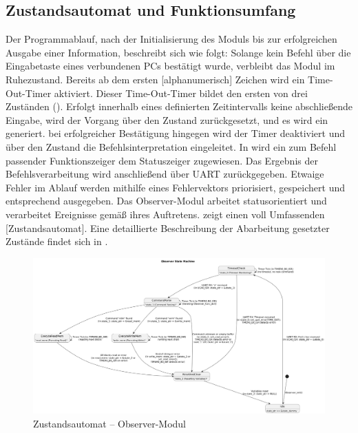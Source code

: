 \newpage
\subsection{Zustandsautomat und Funktionsumfang}
\label{sec:ZustaendeUndFunktionen}

Der Programmablauf, nach der Initialisierung des Moduls bis zur erfolgreichen Ausgabe einer Information, beschreibt sich wie folgt:
Solange kein Befehl \"uber die Eingabetaste eines verbundenen PCs best\"atigt wurde, verbleibt das Modul im Ruhezustand. Bereits ab dem ersten [alphanumerisch] Zeichen wird ein \glqq{}Time-Out-Timer\grqq{} aktiviert. Dieser Time-Out-Timer bildet den ersten von drei Zust\"anden (). Erfolgt innerhalb eines definierten Zeitintervalls keine abschlie{\ss}ende Eingabe, wird der Vorgang \"uber den Zustand  zur\"uckgesetzt, und es wird ein  generiert. bei erfolgreicher Best\"atigung hingegen wird der Timer deaktiviert und \"uber den Zustand  die Befehlsinterpretation eingeleitet. In  wird ein zum Befehl passender Funktionszeiger dem Statuszeiger zugewiesen. Das Ergebnis der Befehlsverarbeitung wird anschlie{\ss}end \"uber UART zur\"uckgegeben. Etwaige Fehler im Ablauf werden mithilfe eines Fehlervektors priorisiert, gespeichert und entsprechend ausgegeben. Das Observer-Modul arbeitet statusorientiert und verarbeitet Ereignisse gem\"a{\ss} ihres Auftretens.  zeigt einen voll Umfassenden [Zustandsautomat].
Eine detaillierte Beschreibung der Abarbeitung gesetzter Zust\"ande findet sich in .

\begin{figure}[h!]
	\centering
	\includegraphics[width=1.0\textwidth]{../Bilder/observer_state_machine.png}
	\caption{Zustandsautomat -- Observer-Modul}
	\label{fig:StateMachine_ObserverModul}
\end{figure}

